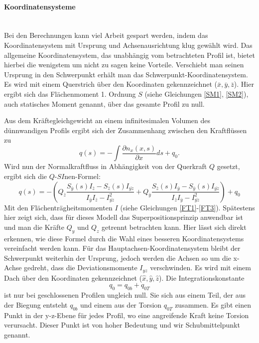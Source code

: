 \paragraph{Koordinatensysteme}~\\
Bei den Berechnungen kann viel Arbeit gespart werden, indem das Koordinatensystem mit Ursprung und Achsenausrichtung klug gewählt wird. Das allgemeine Koordinatensystem, das unabhängig vom betrachteten Profil ist, bietet hierbei die wenigstem um nicht zu sagen keine Vorteile. Verschiebt man seinen Ursprung in den Schwerpunkt erhält man das Schwerpunkt-Koordinatensystem. Es wird mit einem Querstrich über den Koordinaten gekennzeichnet ($\bar{x},\bar{y},\bar{z}$). Hier ergibt sich das Flächenmoment 1. Ordnung  $S$ (siehe Gleichungen \ref{SM1}, \ref{SM2}), auch statisches Moment genannt, über das gesamte Profil zu null.

Aus dem Kräftegleichgewicht an einem infinitesimalen Volumen des dünnwandigen Profils ergibt sich der Zusammenhang zwischen den Kraftflüssen zu
\begin{equation}
	q(s)=-\int\frac{\partial n_x(x,s)}{\partial x}ds+q_0.
\end{equation}
Wird nun der Normalkraftfluss in Abhängigkeit von der Querkraft $Q$ gesetzt, ergibt sich die $Q$-$SI$nen-Formel:
\begin{equation}\label{qs}
	q(s)=-(Q_{\bar{z}}\frac{S_{\bar{y}}(s)I_{\bar{z}}-S_{\bar{z}}(s)I_{\bar{yz}}}{I_{\bar{y}}I_{\bar{z}}-I_{\bar{yz}}^2}+Q_{\bar{y}}\frac{S_{\bar{z}}(s)I_{\bar{y}}-S_{\bar{y}}(s)I_{\bar{yz}}}{I_{\bar{z}}I_{\bar{y}}-I_{\bar{yz}}^2})+q_0
\end{equation}
Mit den Flächenträgheitsmomenten $I$ (siehe Gleichungen \ref{FT1}-\ref{FT3}). Spätestens hier zeigt sich, dass für dieses Modell das Superpositionsprinzip anwendbar ist und man die Kräfte $Q_y$ und $Q_z$ getrennt betrachten kann.
Hier lässt sich direkt erkennen, wie diese Formel durch die Wahl eines besseren Koordinatensystems vereinfacht werden kann. Für das Hauptachsen-Koordinatensystem bleibt der Schwerpunkt weiterhin der Ursprung, jedoch werden die Achsen so um die x-Achse gedreht, dass die Deviationsmomente $I_{yz}$ verschwinden. Es wird mit einem Dach über den Koordinaten gekennzeichnet ($\hat{x},\hat{y},\hat{z}$). Die Integrationskonstante
\begin{equation}
	q_{0} = q_{0b}+q_{0T}
\end{equation}
ist nur bei geschlossenen Profilen ungleich null. Sie sich aus einem Teil, der aus der Biegung entsteht $q_{0b}$ und einem aus der Torsion $q_{0T}$ zusammen. Es gibt einen Punkt in der y-z-Ebene für jedes Profil, wo eine angreifende Kraft keine Torsion verursacht. Dieser Punkt ist von hoher Bedeutung und wir Schubmittelpunkt genannt.
